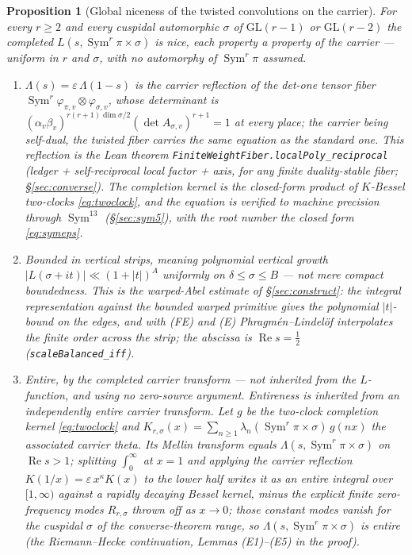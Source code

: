 \documentclass[11pt]{article}
\newtheorem{proposition}[theorem]{Proposition}
\theoremstyle{definition}
\renewcommand{\Re}{\operatorname{Re}}
\newcommand{\Sym}{\operatorname{Sym}}
\begin{document}
\begin{proposition}[Global niceness of the twisted convolutions on the carrier]\label{prop:niceness}
For every $r\ge2$ and every cuspidal automorphic $\sigma$ of $\mathrm{GL}(r-1)$ or $\mathrm{GL}(r-2)$
the completed $L(s,\Sym^r\pi\times\sigma)$ is nice, each property a property of the carrier --- uniform
in $r$ and $\sigma$, with no automorphy of $\Sym^r\pi$ assumed.
\begin{enumerate}
\item[\textup{(FE)}] $\Lambda(s)=\varepsilon\,\Lambda(1-s)$ is the carrier reflection of the det-one
tensor fiber $\Sym^r\varphi_{\pi,v}\otimes\varphi_{\sigma,v}$, whose determinant is
$(\alpha_v\beta_v)^{r(r+1)\dim\sigma/2}(\det A_{\sigma,v})^{r+1}=1$ at every place; the carrier being
self-dual, the twisted fiber carries the same equation as the standard one. This reflection is the Lean
theorem \texttt{FiniteWeightFiber.localPoly\_reciprocal} (ledger + self-reciprocal local factor + axis,
for any finite duality-stable fiber; \S\ref{sec:converse}). The completion kernel is the
closed-form product of $K$-Bessel two-clocks \eqref{eq:twoclock}, and the equation is verified to machine
precision through $\Sym^{13}$ (\S\ref{sec:sym5}), with the root number the closed form \eqref{eq:symeps}.
\item[\textup{(B)}] \emph{Bounded in vertical strips}, meaning polynomial vertical growth
$|L(\sigma+it)|\ll(1+|t|)^A$ uniformly on $\delta\le\sigma\le B$ --- not mere compact boundedness. This is
the warped-Abel estimate of \S\ref{sec:construct}: the integral representation against the bounded warped
primitive gives the polynomial $|t|$-bound on the edges, and with \textup{(FE)} and \textup{(E)}
Phragm\'en--Lindel\"of interpolates the finite order across the strip; the abscissa is $\Re s=\tfrac12$
(\texttt{scaleBalanced\_iff}).
\item[\textup{(E)}] \emph{Entire}, by the completed carrier transform --- \emph{not} inherited from the
$L$-function, and using no zero-source argument. Entireness is inherited from an independently entire
carrier transform. Let $g$ be the two-clock completion kernel \eqref{eq:twoclock} and
$K_{r,\sigma}(x)=\sum_{n\ge1}\lambda_n(\Sym^r\pi\times\sigma)\,g(nx)$ the associated carrier theta. Its
Mellin transform equals $\Lambda(s,\Sym^r\pi\times\sigma)$ on $\Re s>1$; splitting $\int_0^\infty$ at
$x=1$ and applying the carrier reflection $K(1/x)=\varepsilon\,x^{\kappa}K(x)$ to the lower half writes it
as an entire integral over $[1,\infty)$ against a rapidly decaying Bessel kernel, minus the explicit
finite zero-frequency modes $R_{r,\sigma}$ thrown off as $x\to0$; those constant modes vanish for the
cuspidal $\sigma$ of the converse-theorem range, so $\Lambda(s,\Sym^r\pi\times\sigma)$ is entire (the
Riemann--Hecke continuation, Lemmas \textup{(E1)--(E5)} in the proof).
\end{enumerate}
\end{proposition}
\end{document}
